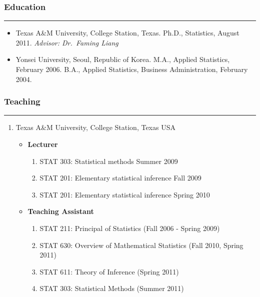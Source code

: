 \documentclass[]{book}
\providecommand{\tightlist}{%
  \setlength{\itemsep}{0pt}\setlength{\parskip}{0pt}}
\begin{document}
\hypertarget{education}{%
\subsubsection*{Education}\label{education}}

\begin{center}\rule{0.5\linewidth}{0.5pt}\end{center}

\begin{itemize}
\item
  Texas A\&M University, College Station, Texas.
  Ph.D., Statistics, August 2011.
  \emph{Advisor: Dr.~Faming Liang}
\item
  Yonsei University, Seoul, Republic of Korea.
  M.A., Applied Statistics, February 2006.
  B.A., Applied Statistics, Business Administration, February 2004.
\end{itemize}

\hypertarget{teaching}{%
\subsubsection*{Teaching}\label{teaching}}

\begin{center}\rule{0.5\linewidth}{0.5pt}\end{center}

\begin{enumerate}
\def\labelenumi{\arabic{enumi}.}
\item
  Texas A\&M University, College Station, Texas USA

  \begin{itemize}
  \item
    \textbf{Lecturer}

    \begin{enumerate}
    \def\labelenumii{\arabic{enumii}.}
    \tightlist
    \item
      STAT 303: Statistical methods Summer 2009
    \item
      STAT 201: Elementary statistical inference Fall 2009
    \item
      STAT 201: Elementary statistical inference Spring 2010
    \end{enumerate}
  \item
    \textbf{Teaching Assistant}

    \begin{enumerate}
    \def\labelenumii{\arabic{enumii}.}
    \tightlist
    \item
      STAT 211: Principal of Statistics (Fall 2006 - Spring 2009)
    \item
      STAT 630: Overview of Mathematical Statistics (Fall 2010, Spring 2011)
    \item
      STAT 611: Theory of Inference (Spring 2011)
    \item
      STAT 303: Statistical Methods (Summer 2011)
    \end{enumerate}
  \end{itemize}
\end{enumerate}
\end{document}
